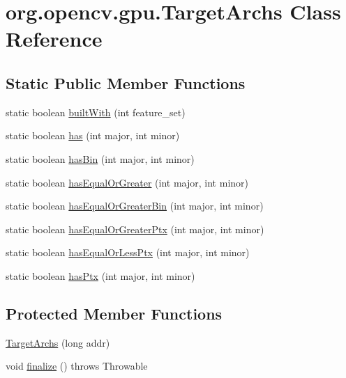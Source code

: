 \hypertarget{classorg_1_1opencv_1_1gpu_1_1_target_archs}{}\section{org.\+opencv.\+gpu.\+Target\+Archs Class Reference}
\label{classorg_1_1opencv_1_1gpu_1_1_target_archs}
\subsection*{Static Public Member Functions}
\begin{DoxyCompactItemize}
\item 
static boolean \mbox{\hyperlink{classorg_1_1opencv_1_1gpu_1_1_target_archs_ae9f6e214f3f09be29813333a301356dd}{built\+With}} (int feature\+\_\+set)
\item 
static boolean \mbox{\hyperlink{classorg_1_1opencv_1_1gpu_1_1_target_archs_a36b25fa0d47177288ba6296b4cfd0816}{has}} (int major, int minor)
\item 
static boolean \mbox{\hyperlink{classorg_1_1opencv_1_1gpu_1_1_target_archs_a5956420c50925da77afa486c45bcea0b}{has\+Bin}} (int major, int minor)
\item 
static boolean \mbox{\hyperlink{classorg_1_1opencv_1_1gpu_1_1_target_archs_abd061965e6a8587277f4b0c7661e760d}{has\+Equal\+Or\+Greater}} (int major, int minor)
\item 
static boolean \mbox{\hyperlink{classorg_1_1opencv_1_1gpu_1_1_target_archs_a99d8456f59064efb19677fc97bd91624}{has\+Equal\+Or\+Greater\+Bin}} (int major, int minor)
\item 
static boolean \mbox{\hyperlink{classorg_1_1opencv_1_1gpu_1_1_target_archs_aabefc9124184a13c86c2240b8d266d71}{has\+Equal\+Or\+Greater\+Ptx}} (int major, int minor)
\item 
static boolean \mbox{\hyperlink{classorg_1_1opencv_1_1gpu_1_1_target_archs_ab7f9485c3895ee1f3fdacee04bfaf3d2}{has\+Equal\+Or\+Less\+Ptx}} (int major, int minor)
\item 
static boolean \mbox{\hyperlink{classorg_1_1opencv_1_1gpu_1_1_target_archs_a96262eb88a70ba293402baa1582d7cea}{has\+Ptx}} (int major, int minor)
\end{DoxyCompactItemize}
\subsection*{Protected Member Functions}
\begin{DoxyCompactItemize}
\item 
\mbox{\hyperlink{classorg_1_1opencv_1_1gpu_1_1_target_archs_a72e504860cf9e2ad06a7dc4790abc2c2}{Target\+Archs}} (long addr)
\item 
void \mbox{\hyperlink{classorg_1_1opencv_1_1gpu_1_1_target_archs_a2092bcced4b78ba938f7e64e2bc7d050}{finalize}} ()  throws Throwable 
\end{DoxyCompactItemize}
